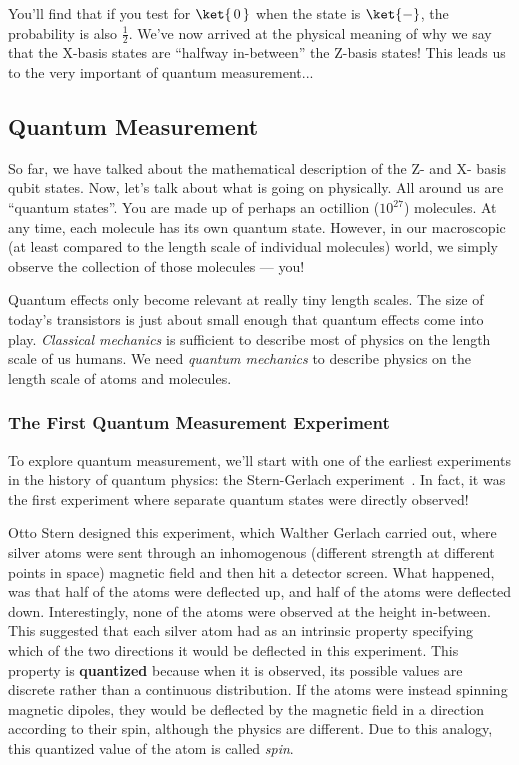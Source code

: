 \documentclass{article}
\theoremstyle{definition}
\newcommand{\kz}[1]{\ket{\,#1\,}}
\newcommand{\kx}[1]{\ket{#1}}
\begin{document}
You'll find that if you test for $\kz0$ when the state is $\kx-$, the probability is also $\frac{1}{2}$.  We've now arrived at the physical meaning of why we say that the X-basis states are ``halfway in-between'' the Z-basis states!  This leads us to the very important of quantum measurement...

\subsection{Quantum Measurement}
So far, we have talked about the mathematical description of the Z- and X- basis qubit states.  Now, let's talk about what is going on physically.
All around us are ``quantum states''.  You are made up of perhaps an octillion ($10^{27}$) molecules.  At any time, each molecule has its own quantum state.  However, in our macroscopic (at least compared to the length scale of individual molecules) world, we simply observe the collection of those molecules --- you!

Quantum effects only become relevant at really tiny length scales.  The size of today's transistors is just about small enough that quantum effects come into play.
\textit{Classical mechanics} is sufficient to describe most of physics on the length scale of us humans.  We need \textit{quantum mechanics} to describe physics on the length scale of atoms and molecules.

\subsubsection{The First Quantum Measurement Experiment}
To explore quantum measurement, we'll start with one of the earliest experiments in the history of quantum physics: the Stern-Gerlach experiment~\cite{Gerlach_Stern_1922}.  In fact, it was the first experiment where separate quantum states were directly observed!

Otto Stern designed this experiment, which Walther Gerlach carried out, where silver atoms were sent through an inhomogenous (different strength at different points in space) magnetic field and then hit a detector screen.  What happened, was that half of the atoms were deflected up, and half of the atoms were deflected down.  Interestingly, none of the atoms were observed at the height in-between.  This suggested that each silver atom had as an intrinsic property specifying which of the two directions it would be deflected in this experiment.  This property is \textbf{quantized} because when it is observed, its possible values are discrete rather than a continuous distribution.  If the atoms were instead spinning magnetic dipoles, they would be deflected by the magnetic field in a direction according to their spin, although the physics are different.  Due to this analogy, this quantized value of the atom is called \textit{spin}.
\end{document}
